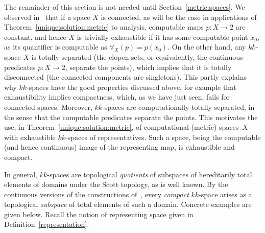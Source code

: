 \documentclass[10pt]{article}
\begin{document}
The remainder of this section is not needed until
Section~\ref{metric:spaces}.  We observed
in~\cite{escardo:exhaustible} that if a space $X$ is connected, as
will be the case in applications of
Theorem~\ref{unique:solution:metric} to analysis, computable maps $p
\colon X \to 2$ are constant, and hence $X$ is trivially exhaustible
if it has some computable point $x_0$, as its quantifier is computable
as $\forall_X(p)=p(x_0)$.  On the other hand, any $kk$-space $X$ is
totally separated (the clopen sets, or equivalently, the continuous
predicates $p \colon X \to 2$, separate the points), which implies
that it is totally disconnected (the connected components are
singletons). This partly explains why $kk$-spaces have the good
properties discussed above, for example that exhaustibility implies
compactness, which, as we have just seen, fails for connected spaces.
Moreover, $kk$-spaces are computationally totally separated, in the
sense that the computable predicates separate the points.  This
motivates the use, in Theorem~\ref{unique:solution:metric}, of
computational (metric) spaces~$X$ with exhaustible $kk$-spaces of
representatives. Such a space, being the computable (and hence
continuous) image of the representing map, is exhaustible and compact.

In general, $kk$-spaces are topological \emph{quotients} of subspaces
of hereditarily total elements of domains under the Scott topology, as
is well known.  By the continuous versions of the constructions
of~\cite{escardo:exhaustible}, every \emph{compact} $kk$-space arises
as a topological \emph{subspace} of total elements of such a domain.
Concrete examples are given below. Recall the notion of
representing space given in Definition~\ref{representation}.
\end{document}
